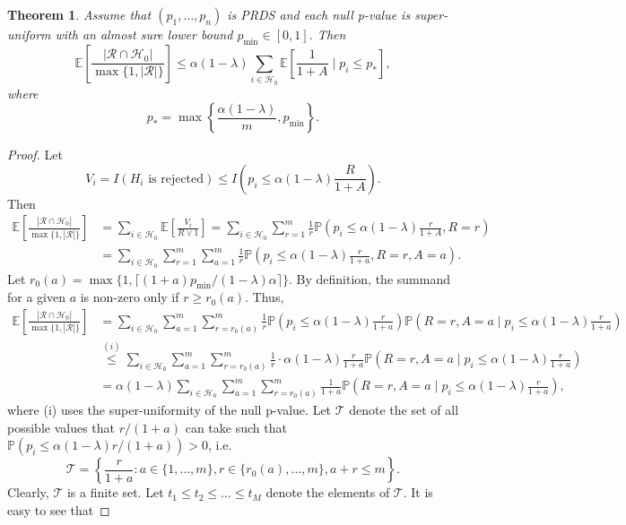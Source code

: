 \documentclass[11pt]{article}
\newtheorem{thm}{Theorem}
\def\E{\mathbb{E}}
\renewcommand{\P}{\mathbb{P}}
\newcommand{\lb}{\left(}
\newcommand{\rb}{\right)}
\newcommand{\T}{\mathcal{T}}
\begin{document}
\begin{thm}\label{thm:storey_BH_generic}
Assume that $(p_1, \ldots, p_n)$ is PRDS and each null p-value is super-uniform with an almost sure lower bound $p_{\min}\in [0, 1]$. Then
\[\E\left[\frac{|\mathcal{R} \cap \mathcal{H}_0|}{\max\{1, |\mathcal{R}|\} } \right]\le \alpha(1 - \lambda)\sum_{i\in \mathcal{H}_0}\E\left[\frac{1}{1 + A}\mid p_i\le p_{*}\right],\]
where
\[p_{*} = \max\left\{\frac{\alpha(1 - \lambda)}{m}, p_{\min}\right\}.\]
\end{thm}
\begin{proof}
Let
  \[V_i = I(H_i \text{ is rejected}) \le I\lb p_i \le \alpha(1 - \lambda)\frac{R}{1 + A}\rb.\]
  Then
  \begin{align*}
    \E\left[\frac{|\mathcal{R} \cap \mathcal{H}_0|}{\max\{1, |\mathcal{R}|\} } \right]
    &= \sum_{i\in \mathcal{H}_0}\E\left[\frac{V_i}{R\vee 1}\right] = \sum_{i\in \mathcal{H}_0}\sum_{r = 1}^{m}\frac{1}{r}\P\lb p_i \le \alpha(1 - \lambda)\frac{r}{1 + A}, R = r\rb\\
    & = \sum_{i\in \mathcal{H}_0}\sum_{r = 1}^{m}\sum_{a = 1}^{m}\frac{1}{r}\P\lb p_i \le \alpha(1 - \lambda)\frac{r}{1 + a}, R = r, A = a\rb.
  \end{align*}
   Let $r_0(a) = \max\{1, \lceil(1 + a)p_{\min} / (1 - \lambda)\alpha\rceil\}$. By definition, the summand for a given $a$ is non-zero only if $r\ge r_{0}(a)$. Thus,
  \begin{align*}
    \E\left[\frac{|\mathcal{R} \cap \mathcal{H}_0|}{\max\{1, |\mathcal{R}|\} } \right]
    & = \sum_{i\in \mathcal{H}_0}\sum_{a = 1}^{m}\sum_{r = r_{0}(a)}^{m}\frac{1}{r}\P\lb p_i \le \alpha(1 - \lambda)\frac{r}{1 + a}\rb\P\lb R = r, A = a\mid p_i \le \alpha(1 - \lambda)\frac{r}{1 + a}\rb\\
    & \stackrel{(i)}{\le} \sum_{i\in \mathcal{H}_0}\sum_{a = 1}^{m}\sum_{r = r_0(a)}^{m}\frac{1}{r}\cdot \alpha(1 - \lambda)\frac{r}{1 + a}\P\lb R = r, A = a\mid p_i \le \alpha(1 - \lambda)\frac{r}{1 + a}\rb\\
    & = \alpha(1 - \lambda)\sum_{i\in \mathcal{H}_0}\sum_{a = 1}^{m}\sum_{r = r_{0}(a)}^{m}\frac{1}{1 + a}\P\lb R = r, A = a\mid p_i \le \alpha(1 - \lambda)\frac{r}{1 + a}\rb,
  \end{align*}
  where (i) uses the super-uniformity of the null p-value. Let $\T$ denote the set of all possible values that $r / (1 + a)$ can take such that $\P(p_i \le \alpha(1 - \lambda)r / (1 + a)) > 0$, i.e.
  \[\T = \left\{\frac{r}{1 + a}: a\in \{1, \ldots, m\}, r\in \{r_{0}(a), \ldots, m\}, a + r \le m\right\}.\]
  Clearly, $\T$ is a finite set. Let $t_1\le t_2 \le \ldots \le t_M$ denote the elements of $\T$. It is easy to see that

\end{proof}
\end{document}
